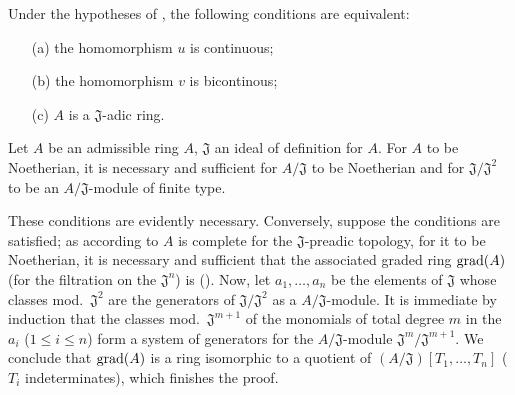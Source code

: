 \begin{corollary}[7.2.5]
\label{0.7.2.5}
Under the hypotheses of , the following conditions are
equivalent:
\begin{enumerate}
  \item[{\rm(a)}] the homomorphism $u$ is continuous;
  \item[{\rm(b)}] the homomorphism $v$ is bicontinous;
  \item[{\rm(c)}] $A$ is a $\mathfrak{J}$-adic ring.
\end{enumerate}
\end{corollary}

\begin{corollary}[7.2.6]
\label{0.7.2.6}
Let $A$ be an admissible ring $A$, $\mathfrak{J}$ an ideal of definition for $A$.
For $A$ to be Noetherian, it is necessary and sufficient for $A/\mathfrak{J}$ to be Noetherian and for $\mathfrak{J}/\mathfrak{J}^2$ to be an $A/\mathfrak{J}$-module of finite type.
\end{corollary}

These conditions are evidently necessary. Conversely, suppose the conditions
are satisfied; as according to  $A$ is complete for the
$\mathfrak{J}$-preadic topology, for it to be Noetherian, it is necessary and sufficient
that the associated graded ring ${\mathop{\mathrm{grad}}\nolimits}(A)$ (for the filtration on the
$\mathfrak{J}^n$) is (\cite[p~.18--07, th.~4]{I-1}). Now, let $a_1,\dots,a_n$ be
the elements of $\mathfrak{J}$ whose classes mod.~$\mathfrak{J}^2$ are the
generators of $\mathfrak{J}/\mathfrak{J}^2$ as a $A/\mathfrak{J}$-module. It
is immediate by induction that the classes mod.~$\mathfrak{J}^{m+1}$ of the
monomials of total degree $m$ in the $a_i$ ($1\leq i\leq n$) form a
system of generators for the $A/\mathfrak{J}$-module
$\mathfrak{J}^m/\mathfrak{J}^{m+1}$. We conclude that ${\mathop{\mathrm{grad}}\nolimits}(A)$ is a ring
isomorphic to a quotient of $(A/\mathfrak{J})[T_1,\dots,T_n]$ ($T_i$
indeterminates), which finishes the proof.

